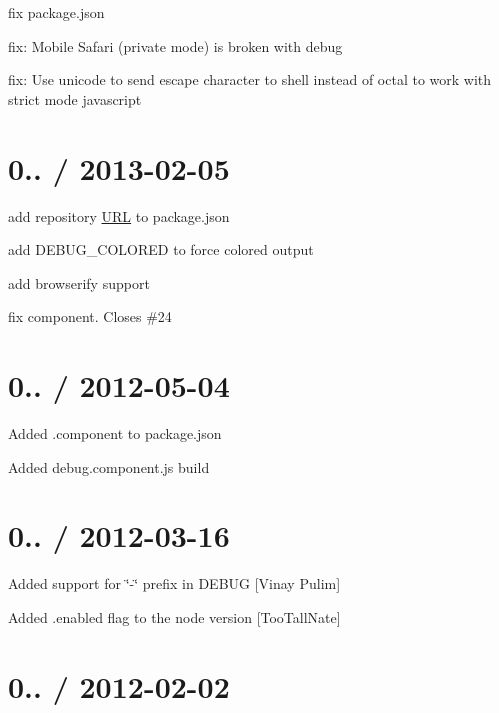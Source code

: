 \begin{DoxyItemize}
\item fix package.\+json
\item fix\+: Mobile Safari (private mode) is broken with debug
\item fix\+: Use unicode to send escape character to shell instead of octal to work with strict mode javascript
\end{DoxyItemize}

\section*{0.. / 2013-\/02-\/05 }


\begin{DoxyItemize}
\item add repository \mbox{\hyperlink{namespace_u_r_l}{U\+RL}} to package.\+json
\item add D\+E\+B\+U\+G\+\_\+\+C\+O\+L\+O\+R\+ED to force colored output
\item add browserify support
\item fix component. Closes \#24
\end{DoxyItemize}

\section*{0.. / 2012-\/05-\/04 }


\begin{DoxyItemize}
\item Added .component to package.\+json
\item Added debug.\+component.\+js build
\end{DoxyItemize}

\section*{0.. / 2012-\/03-\/16 }


\begin{DoxyItemize}
\item Added support for \char`\"{}-\/\char`\"{} prefix in D\+E\+B\+UG \mbox{[}Vinay Pulim\mbox{]}
\item Added {\ttfamily .enabled} flag to the node version \mbox{[}Too\+Tall\+Nate\mbox{]}
\end{DoxyItemize}

\section*{0.. / 2012-\/02-\/02 }



